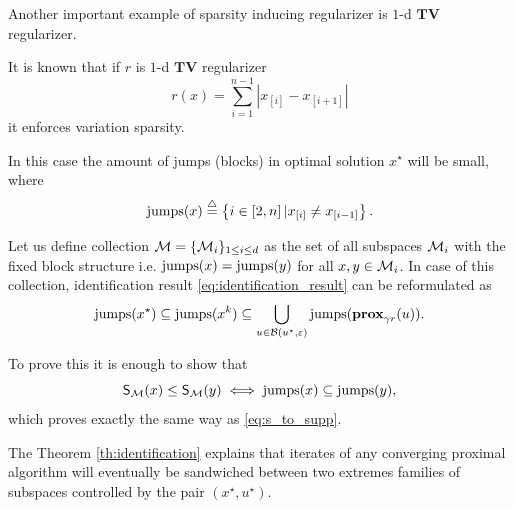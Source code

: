Another important example of sparsity inducing regularizer is $1$-d $\mathbf{TV}$ regularizer.
\begin{example}
It is known that if $r$ is $1$-d $\mathbf{TV}$ regularizer
\begin{equation}\label{eq:tvreg}
    r(x) = \sum\limits_{i=1}^{n-1}|x_{[i]} - x_{[i+1]}|
\end{equation}
it enforces variation sparsity.	

In this case the amount of jumps (blocks) in optimal solution $x^\star$ will be small, where
\begin{equation}
\mathrm{jumps}(x)\stackrel{\triangle}{=} \left\{i\in [2,n]\,| x_{[i]} \neq x_{[i-1]} \right\}.	
\end{equation}

Let us define collection $\mathcal{M} = \{\mathcal{M}_i\}_{1\leq i\leq d}$ as the set of all subspaces $\mathcal{M}_i$ with the fixed block structure i.e. $\mathrm{jumps}(x) = \mathrm{jumps}(y)$ for all $x,y\in \mathcal{M}_i$. In case of this collection, identification result \eqref{eq:identification_result} can be reformulated as
\begin{equation}\label{eq:ident_tv}
    \mathrm{jumps}(x^\star) \subseteq \mathrm{jumps}(x^k) \subseteq \bigcup_{u\in\mathcal{B}(u^\star,\varepsilon)} \mathrm{jumps}(\mathbf{prox}_{\gamma r}(u)).
\end{equation}

To prove this it is enough to show that
\begin{equation}\label{eq:s_to_jumps}
    \mathsf{S}_{\mathcal{M}}(x)\leq\mathsf{S}_{\mathcal{M}}(y) \iff \mathrm{jumps}(x)\subseteq\mathrm{jumps}(y),
\end{equation}
which proves exactly the same way as \eqref{eq:s_to_supp}.

\end{example}


The Theorem \ref{th:identification} explains that iterates of any converging proximal algorithm will eventually be sandwiched between two extremes families of subspaces controlled by the pair $(x^\star, u^\star)$.